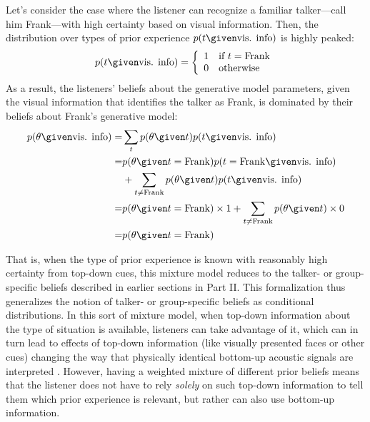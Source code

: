 Let's consider the case where the listener can recognize a familiar talker---call him Frank---with high certainty based on visual information.  Then, the distribution over types of prior experience $p(t \given \textrm{vis. info})$ is highly peaked:
\begin{equation}
  \label{eq:31}
  p(t \given \textrm{vis. info}) = \left \{
    \begin{array}{rl}
      1 & \textrm{if } t=\mathrm{Frank} \\
      0 & \mathrm{otherwise}
    \end{array}
  \right .
\end{equation}
As a result, the listeners' beliefs about the generative model parameters, given the visual information that identifies the talker as Frank, is dominated by their beliefs about Frank's generative model: 
\begin{align}
  \label{eq:32}
  p(\theta \given \textrm{vis. info}) =& \sum_t p(\theta \given t) p(t \given \textrm{vis. info}) \\
  =&p(\theta \given t=\mathrm{Frank}) p(t=\mathrm{Frank} \given \textrm{vis. info}) \\
  & + \sum_{t \ne \mathrm{Frank}} p(\theta \given t) p(t \given \textrm{vis. info}) \\
  =& p(\theta \given t=\mathrm{Frank}) \times 1 + \sum_{t \ne \mathrm{Frank}} p(\theta \given t) \times 0 \\
  =& p(\theta \given t=\mathrm{Frank})
\end{align}

That is, when the type of prior experience is known with reasonably high certainty from top-down cues, this mixture model reduces to the talker- or group-specific beliefs described in earlier sections in Part II.  This formalization thus generalizes the notion of talker- or group-specific beliefs as conditional distributions.  In this sort of mixture model, when top-down information about the type of situation is available, listeners can take advantage of it, which can in turn lead to effects of top-down information (like visually presented faces or other cues) changing the way that physically identical bottom-up acoustic signals are interpreted \autocite{Johnson1999,Hay2010,StaumCasasanto2008,Strand1996}.  However, having a weighted mixture of different prior beliefs means that the listener does not have to rely \emph{solely} on such top-down information to tell them which prior experience is relevant, but rather can also use bottom-up information.

